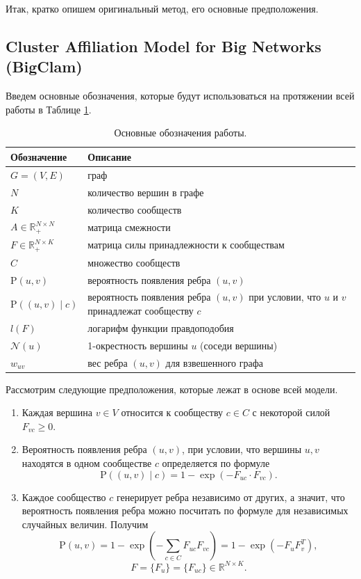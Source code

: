 \documentclass{ITaSconf}
\def\PP{\mathrm{P}}
\begin{document}
	Итак, кратко опишем оригинальный метод, его основные предположения.
	
	\subsection{Cluster Affiliation Model for Big Networks (BigClam)}
	
	Введем основные обозначения, которые будут использоваться на протяжении всей работы в Таблице \ref{table:notation}. 
	\begin{table}[!t]
		{
			\centering
			\small
			\begin{tabular}{ p{5.5em} p{17.5em} }
				\hline
				\hline
				Обозначение 						& Описание \\
				\hline
				$G = (V,E) $ 						& граф \\
				$N$									& количество вершин в графе \\
				$K$									& количество сообществ \\
				$A \in \mathbb{R}_{+}^{N\times N}$  & матрица смежности \\
				$F \in \mathbb{R}_{+}^{N\times K}$  & матрица силы принадлежности к сообществам			\\
				$C$									& множество сообществ \\
				$\PP(u,v)$							& вероятность появления ребра $(u,v)$ \\
				$\PP((u,v) \mid c)$ 					& вероятность появления ребра $(u,v)$ при условии, что $u$ и $v$ принадлежат сообществу $c$ \\
				
				$l(F)$								& логарифм функции правдоподобия \\
				$\mathcal{N}(u)$ 					& 1-окрестность вершины $u$ (соседи вершины) \\
				$w_{uv}$							& вес ребра $(u,v)$ для взвешенного графа \\
				\hline
				\hline
			\end{tabular}
		}
		\caption{Основные обозначения работы.}
		\label{table:notation}
	\end{table}
	Рассмотрим следующие предположения, которые лежат в основе всей модели.
	\begin{enumerate}
		\item Каждая вершина $v\in V$ относится к сообществу $c \in C$ с некоторой силой
		$F_{vc} \ge 0.$
		\item Вероятность появления ребра $(u,v)$, при условии, что вершины $u,v$ находятся в одном сообществе $c$ определяется по формуле 
		$$\PP((u,v) \mid c)=1 - \exp(-F_{uc}\cdot F_{vc}).$$
		\item Каждое сообщество $c$ генерирует ребра независимо от других, а значит, что вероятность появления ребра можно посчитать по формуле для независимых случайных величин. Получим
		$$\PP(u,v)=1 - \exp(-\sum_{c\in C} F_{uc} F_{vc}) = 1 - \exp( - F_{u} F_{v}^T),$$
		$$F = \{F_u\} = \{F_{uc}\} \in \mathbb {R}^{N \times K}. $$
	\end{enumerate}
	
\end{document}

